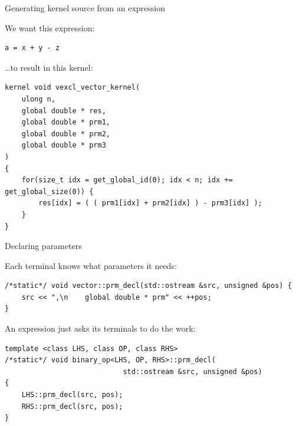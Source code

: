 \documentclass[@BEAMER_OPTIONS@]{beamer}
\begin{document}
\begin{frame}[fragile]{Generating kernel source from an expression}
    \begin{exampleblock}{We want this expression:}
        \begin{lstlisting}
a = x + y - z
        \end{lstlisting}
    \end{exampleblock}
    \begin{exampleblock}{\ldots to result in this kernel:}
        \begin{lstlisting}
kernel void vexcl_vector_kernel(
    ulong n,
    global double * res,
    global double * prm1,
    global double * prm2,
    global double * prm3
)
{
    for(size_t idx = get_global_id(0); idx < n; idx += get_global_size(0)) {
        res[idx] = ( ( prm1[idx] + prm2[idx] ) - prm3[idx] );
    }
}
        \end{lstlisting}
    \end{exampleblock}
\end{frame}

\note{ }

\begin{frame}[fragile]{Declaring parameters}
    \begin{exampleblock}{Each terminal knows what parameters it needs:}
        \begin{lstlisting}
/*static*/ void vector::prm_decl(std::ostream &src, unsigned &pos) {
    src << ",\n    global double * prm" << ++pos;
}
        \end{lstlisting}
    \end{exampleblock}
    \begin{exampleblock}{An expression just asks its terminals to do the work:}
        \begin{lstlisting}[firstnumber=last]
template <class LHS, class OP, class RHS>
/*static*/ void binary_op<LHS, OP, RHS>::prm_decl(
                            std::ostream &src, unsigned &pos)
{
    LHS::prm_decl(src, pos);
    RHS::prm_decl(src, pos);
}
        \end{lstlisting}
    \end{exampleblock}
\end{frame}
\end{document}
